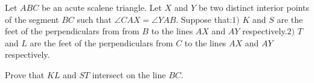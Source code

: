 Let $ABC$ be an acute scalene triangle. Let $X$ and $Y$ be two distinct interior points of the segment $BC$ such that $\angle{CAX} = \angle{YAB}$. Suppose that:$1)$ $K$ and $S$ are the feet of the perpendiculars from from $B$ to the lines $AX$ and $AY$ respectively.$2)$ $T$ and $L$ are the feet of the perpendiculars from $C$ to the lines $AX$ and $AY$ respectively.

Prove that $KL$ and $ST$ intersect on the line $BC$.